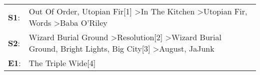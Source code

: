 \begin{supertabular}{p{0.03\textwidth}p{0.92\textwidth}}
 \textbf{S1}:  &                         Out Of Order\textsuperscript{}, \enspace Utopian Fir[1]\textsuperscript{} \textgreater \enspace In The Kitchen\textsuperscript{} \textgreater \enspace Utopian Fir\textsuperscript{}, \enspace Words\textsuperscript{} \textgreater \enspace Baba O'Riley\textsuperscript{}  \enspace  \\
 \textbf{S2}:  &  Wizard Burial Ground\textsuperscript{} \textgreater \enspace Resolution[2]\textsuperscript{} \textgreater \enspace Wizard Burial Ground\textsuperscript{}, \enspace Bright Lights, Big City[3]\textsuperscript{} \textgreater \enspace August\textsuperscript{}, \enspace JaJunk\textsuperscript{}  \enspace  \\
 \textbf{E1}:  &                                                                                                                                                                                                                                                                The Triple Wide[4]\textsuperscript{}  \enspace  \\
\end{supertabular}
